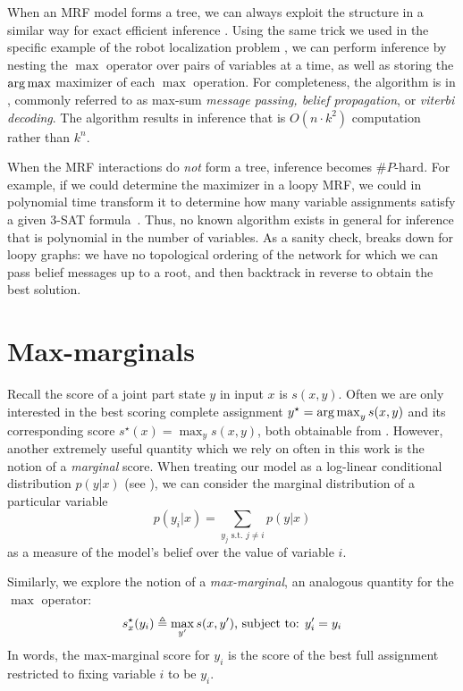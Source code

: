 When an MRF model forms a tree, we can always exploit the structure in a 
similar way for exact efficient inference \citep{koller-book}.  Using the same 
trick we used in the specific example of the robot localization problem 
, we can perform inference by nesting the $\max$ operator over 
pairs of variables at a time, as well as storing the $\mathop{\arg\max}$ maximizer of 
each $\max$ operation.  For completeness, the algorithm is in 
, commonly referred to as max-sum {\em message passing, 
belief propagation}, or {\em viterbi decoding}.  The algorithm results in 
inference that is $O(n\cdot k^2)$ computation rather than $k^n$.

When the MRF interactions do {\em not } form a tree, inference becomes 
$\#P$-hard.  For example, if we could determine the maximizer in a loopy MRF, 
we could in polynomial time transform it to determine how many variable 
assignments satisfy a given 3-SAT formula~\citep{valiant-sharpP,koller-book}.  
Thus, no known algorithm exists in general for inference that is polynomial in 
the number of variables.  As a sanity check,  breaks down 
for loopy graphs: we have no topological ordering of the network for which we 
can pass belief messages up to a root, and then backtrack in reverse to obtain 
the best solution.



\section{Max-marginals}\label{sec:max-marginals}

Recall the score  of a joint part state $y$ in input $x$ is $s(x,y)$. Often we
are only interested in the best scoring complete assignment $y^\star = 
\mathop{\arg\max}_y s(x,y)$ and its corresponding score $s^\star(x) = \max_y s(x,y)$, 
both obtainable from .  However, another extremely useful 
quantity which we rely on often in this work is the notion of a {\em marginal} 
score.  When treating our model as a log-linear conditional distribution 
$p(y|x)$ (see ), we can consider the marginal distribution 
of a particular variable
\begin{equation}
p(y_i|x) = \sum_{y_j \text{ s.t. } j \neq i} p(y|x)
\end{equation}
as a measure of the model's belief over the value of variable $i$.  

Similarly, we explore the notion of a {\em max-marginal}, an analogous quantity 
for the $\max$ operator:
\begin{align}
s^\star_x(y_i) \triangleq  \max_{y'} s(x,y') \text{, subject to: } y_i' = y_i
 \end{align}
In words, the max-marginal score for $y_i$ is the score of the best full 
assignment restricted to fixing variable $i$ to be $y_i$. 

